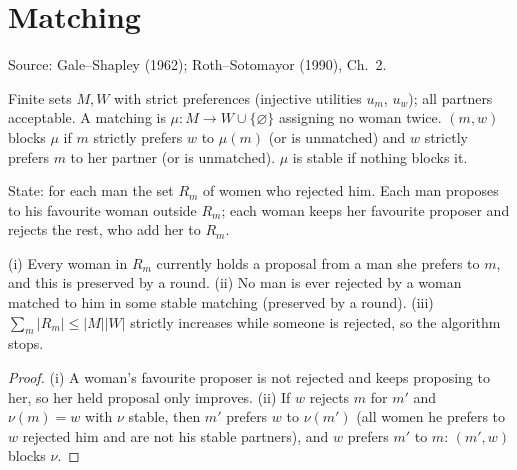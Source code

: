 \chapter{Matching}
\label{chap:matching}

Source: Gale--Shapley (1962); Roth--Sotomayor (1990), Ch.~2.

\begin{definition}
\label{def:stable-matching}
\leanok
Finite sets $M, W$ with strict preferences (injective utilities $u_m$, $u_w$); all partners acceptable. A matching is
$\mu : M \to W \cup \{\varnothing\}$ assigning no woman twice. $(m,w)$ blocks $\mu$ if $m$ strictly prefers $w$ to
$\mu(m)$ (or is unmatched) and $w$ strictly prefers $m$ to her partner (or is unmatched). $\mu$ is stable if
nothing blocks it.
\end{definition}

\begin{definition}
\label{def:da}
\leanok
State: for each man the set $R_m$ of women who rejected him. Each man proposes to his favourite woman outside
$R_m$; each woman keeps her favourite proposer and rejects the rest, who add her to $R_m$.
\end{definition}

\begin{lemma}
\label{lem:da}
\leanok
{}
(i) Every woman in $R_m$ currently holds a proposal from a man she prefers to $m$, and this is preserved by a round.
(ii) No man is ever rejected by a woman matched to him in some stable matching (preserved by a round).
(iii) $\sum_m |R_m| \le |M||W|$ strictly increases while someone is rejected, so the algorithm stops.
\end{lemma}
\begin{proof}
\leanok
(i) A woman's favourite proposer is not rejected and keeps proposing to her, so her held proposal only improves.
(ii) If $w$ rejects $m$ for $m'$ and $\nu(m) = w$ with $\nu$ stable, then $m'$ prefers $w$ to $\nu(m')$
(all women he prefers to $w$ rejected him and are not his stable partners), and $w$ prefers $m'$ to $m$: $(m',w)$ blocks $\nu$.
\end{proof}

